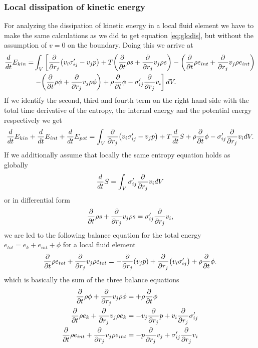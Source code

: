 \subsubsection{Local dissipation of kinetic energy}
For analyzing the dissipation of kinetic energy in a local fluid element we
have to make the same calculations as we did to get equation \eqref{eq:glodis},
but without the assumption of $v=0$ on the boundary. Doing this we arrive at
\begin{align}
\begin{split}
\frac{d}{d t} E_{kin} =& \int_V \left[ \frac{\partial}{\partial r_j}{ \left( v_i \sigma'_{ij}-v_j p \right) } 
+ T{ \left( \frac{\partial}{\partial t}\rho s + \frac{\partial}{\partial r_j} v_j \rho s \right) } 
- { \left( \frac{\partial}{\partial t}\rho e_{int} + \frac{\partial}{\partial r_j} v_j \rho e_{int} \right) } \right. \\
&\left. -{ \left( \frac{\partial}{\partial t}\rho \phi + \frac{\partial}{\partial r_j} v_j \rho \phi \right) }
+ \rho\frac{\partial}{\partial t}\phi -\sigma'_{ij}\frac{\partial}{\partial r_j}v_i \right] dV.
\end{split}
\end{align}
If we identify the second, third and fourth term on the right hand side with the
total time derivative of the entropy, the internal energy and the potential
energy respectively we get
\begin{align}
\frac{d}{d t} E_{kin} + \frac{d}{d t} E_{int} + \frac{d}{d t} E_{pot} = 
\int_V \frac{\partial}{\partial r_j}{ \left( v_i \sigma'_{ij}-v_j p \right) } + T \frac{d}{d t} S
+ \rho\frac{\partial}{\partial t}\phi -\sigma'_{ij}\frac{\partial}{\partial r_j}v_i dV.
\end{align}
If we additionally assume that locally the same entropy equation holds as
globally
\begin{align}
\frac{d}{d t} S = \int_V \sigma'_{ij}\frac{\partial}{\partial r_j}v_i dV
\end{align}
or in differential form
\begin{align}
\frac{\partial}{\partial t}\rho s + \frac{\partial}{\partial r_j} v_j \rho s = \sigma'_{ij}\frac{\partial}{\partial r_j}v_i,
\end{align}
we are led to the following balance equation for the total energy
$e_{tot}=e_k+e_{int}+\phi$ for a local fluid element
\begin{align}
\frac{\partial}{\partial t}\rho e_{tot} + \frac{\partial}{\partial r_j} v_j \rho e_{tot} = -\frac{\partial}{\partial r_j}{ \left( v_j p \right) }
+\frac{\partial}{\partial r_j}{ \left( v_i \sigma'_{ij} \right) } + \rho \frac{\partial}{\partial t} \phi. \label{eq:etotal}
\end{align}
which is basically the sum of the three balance equations
\begin{align}
\frac{\partial}{\partial t}\rho \phi + \frac{\partial}{\partial r_j} v_j \rho \phi &=  + \rho \frac{\partial}{\partial t} \phi \\
\frac{\partial}{\partial t}\rho e_{k} + \frac{\partial}{\partial r_j} v_j \rho e_{k} &= -v_j \frac{\partial}{\partial r_j} p
+ v_i \frac{\partial}{\partial r_j} \sigma'_{ij}\\
\frac{\partial}{\partial t}\rho e_{int} + \frac{\partial}{\partial r_j} v_j \rho e_{int} &= -p \frac{\partial}{\partial r_j}v_j
+\sigma'_{ij} \frac{\partial}{\partial r_j}v_i
\end{align}
